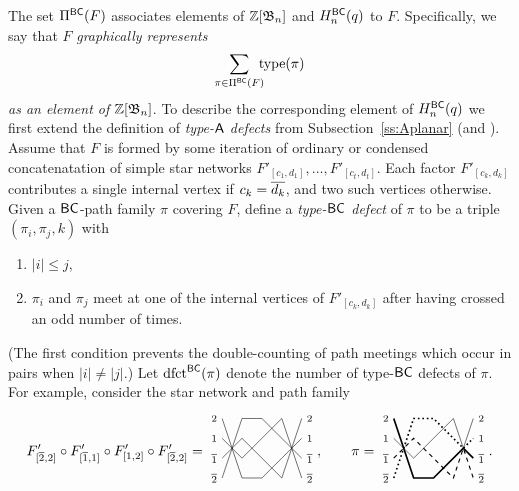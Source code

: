 \documentclass[11pt]{article}
\theoremstyle{definition}
\numberwithin{equation}{section}
\begin{document}
The set $\Pi^{\mathsf{BC}}(F)$ associates elements of $\mathbb{Z}[\mathfrak{B}_n]$ and $H_n^{\mathsf{BC}}(q)$
to $F$. Specifically, we say that
$F$ {\em graphically represents}
\begin{equation}\label{eq:Gtozsnbc}
\sum_{\pi \in \PiBC(F)} \nTksp \type(\pi)
\end{equation}
{\em as an element of $\mathbb{Z}[\mathfrak{B}_n]$}.
To describe the corresponding element of $H_n^{\mathsf{BC}}(q)$ we first extend
the definition of {\em type-$\mathsf{A}$ defects} from
Subsection~\ref{ss:Aplanar} (and
\cite{BWHex, CSkanTNNChar, Deodhar90}).
Assume that $F$
is formed by some iteration
of ordinary or condensed concatenatation
of simple star networks $F'_{[c_1,d_1]}, \dotsc, F'_{[c_t,d_t]}$.
Each factor $F'_{[c_k, d_k]}$ contributes a single internal vertex
if $c_k = \overline{d_k}$, and two such vertices otherwise.
Given a $\mathsf{BC}$-path family $\pi$ covering $F$,
define a {\em type-$\mathsf{BC}$ defect} of $\pi$ to be
a triple $(\pi_i, \pi_j, k)$ with
\begin{enumerate}
\item $|i| \leq j$,
\item $\pi_i$ and $\pi_j$ meet at one of the internal vertices of
  $F'_{[c_k,d_k]}$ after having crossed an odd number of times.
\end{enumerate}
(The first condition prevents the double-counting of path meetings
which occur in pairs when $|i| \neq |j|$.)
Let $\mathrm{dfct}^{\mathsf{BC}}(\pi)$ denote the number of type-$\mathsf{BC}$ defects of $\pi$.
For example, consider the star network
and path family
\begin{equation}\label{eq:all010}
  F'_{[\ol2,2]} \circ F'_{[\ol1,1]} \circ F'_{[1,2]} \circ F'_{[\ol2,2]} =
\begin{tikzpicture}[scale=.5,baseline=-5]
\node at (-.4,1.5) {$\scriptstyle{2}$};
\node at (-.4,0.5) {$\scriptstyle{1}$};  
\node at (-.4,-0.5) {$\scriptstyle{\ol1}$};
\node at (-.4,-1.5) {$\scriptstyle{\ol2}$};  
\node at (4.4,1.5) {$\scriptstyle{2}$};
\node at (4.4,0.5) {$\scriptstyle{1}$};  
\node at (4.4,-0.5) {$\scriptstyle{\ol1}$};
\node at (4.4,-1.5) {$\scriptstyle{\ol2}$};  
\draw[-] (0,1.5) -- (1,-1.5) -- (2,-1.5) -- (3,-.5) -- (3.5,0) -- (4,.5);
\draw[-] (0,-1.5) -- (1,1.5) -- (2,1.5) -- (3,.5) -- (3.5,0) -- (4,-.5);
\draw[-] (0,.5) -- (1,-.5) -- (2,.5) -- (3,1.5) -- (3.5,0) -- (4,1.5);
\draw[-] (0,-.5) -- (1,.5) -- (2,-.5) -- (3,-1.5) -- (3.5,0) -- (4,-1.5);
\end{tikzpicture},\qquad
\pi = 
\begin{tikzpicture}[scale=.5,baseline=-5]
\node at (-.4,1.5) {$\scriptstyle{2}$};
\node at (-.4,0.5) {$\scriptstyle{1}$};  
\node at (-.4,-0.5) {$\scriptstyle{\ol1}$};
\node at (-.4,-1.5) {$\scriptstyle{\ol2}$};  
\node at (4.4,1.5) {$\scriptstyle{2}$};
\node at (4.4,0.5) {$\scriptstyle{1}$};  
\node at (4.4,-0.5) {$\scriptstyle{\ol1}$};
\node at (4.4,-1.5) {$\scriptstyle{\ol2}$};  
\draw[-, very thick]
(0,1.5) -- (1,-1.5) -- (2,-1.5) -- (3,-.5) -- (3.5,0) -- (4,-.5);
\draw[-]
(0,.5) -- (1,-.5) -- (2,.5) -- (3,1.5) -- (3.5,0) -- (4,1.5);
\draw[-, dashed, thick]
(0,-.5) -- (1,.5) -- (2,-.5) -- (3,-1.5) -- (3.5,0) -- (4,-1.5);
\draw[-, very thick, dotted]
(0,-1.5) -- (1,1.5) -- (2,1.5) -- (3,.5) -- (3.5,0) -- (4,.5);
\end{tikzpicture}.
\end{equation}
\end{document}
